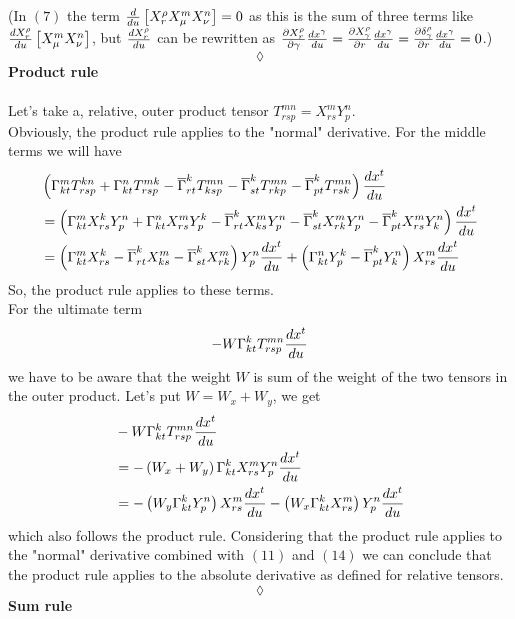 (In $(7)$ the term $ \dv{}{u}\left[X^{\rho}_{r}X^{m}_{\mu}X^{n}_{\nu}\right]=0$ as this is the sum of three terms like $\dv{X^{\rho}_{r}}{u}\left[X^{m}_{\mu}X^{n}_{\nu}\right]$, but $\dv{X^{\rho}_{r}}{u}$ can be rewritten as  $\pdv{X^{\rho}_{r}}{\gamma}\dv{x^{\gamma}}{u}= \pdv{X^{\rho}_{\gamma}}{r}\dv{x^{\gamma}}{u}= \pdv{\delta^{\rho}_{\gamma}}{r}\dv{x^{\gamma}}{u} = 0$.)
$$\lozenge$$
\textbf{Product rule}\\\\
Let's take a, relative,  outer product tensor $T^{mn}_{rsp} =X^{m}_{rs}Y^{n}_{p} $.\\
Obviously, the product rule applies to the "normal" derivative.
For the middle terms we will have
\begin{align}
&\left(\Gamma^m_{kt}T^{kn}_{rsp}+\Gamma^n_{kt}T^{mk}_{rsp}-\overline{\Gamma}^k_{rt}T^{mn}_{ksp} -\overline{\Gamma}^k_{st}T^{mn}_{rkp} -\overline{\Gamma}^k_{pt}T^{mn}_{rsk} \right)\dv{x^t}{u}\\
&= \left(\Gamma^m_{kt}X^{k}_{rs}Y^{n}_{p}+\Gamma^n_{kt}X^{m}_{rs}Y^{k}_{p}-\overline{\Gamma}^k_{rt}X^{m}_{ks}Y^{n}_{p} -\overline{\Gamma}^k_{st}X^{m}_{rk}Y^{n}_{p} -\overline{\Gamma}^k_{pt}X^{m}_{rs}Y^{n}_{k} \right)\dv{x^t}{u}\\
&= \left(\Gamma^m_{kt}X^{k}_{rs}-\overline{\Gamma}^k_{rt}X^{m}_{ks} -\overline{\Gamma}^k_{st}X^{m}_{rk}  \right)Y^{n}_{p}\dv{x^t}{u}+\left(\Gamma^n_{kt}Y^{k}_{p}  -\overline{\Gamma}^k_{pt}Y^{n}_{k} \right)X^{m}_{rs}\dv{x^t}{u}
\end{align}
So, the product rule applies to these terms.\\
For the ultimate term 
$$-W\Gamma^k_{kt}T^{mn}_{rsp}\dv{x^t}{u}$$ we have to be aware that the weight $W$ is sum of the weight of the two tensors in the outer product. Let's put $W= W_x + W_y$, we get
\begin{align}
&-W\Gamma^k_{kt}T^{mn}_{rsp}\dv{x^t}{u}\\
&= 
-\left(W_x+W_y\right)\Gamma^k_{kt}X^{m}_{rs}Y^{n}_{p}\dv{x^t}{u}\\
&= 
-\left(W_y\Gamma^k_{kt}Y^{n}_{p}\right)X^{m}_{rs}\dv{x^t}{u}-\left(W_x\Gamma^k_{kt}X^{m}_{rs}\right)Y^{n}_{p}\dv{x^t}{u}
\end{align}
which also follows the product rule. 
Considering that the product rule applies to the "normal" derivative combined with $(11)$ and $(14)$ we can conclude that the product rule applies to the absolute derivative as defined for relative tensors.
$$\lozenge$$
\textbf{Sum rule}\\\\
